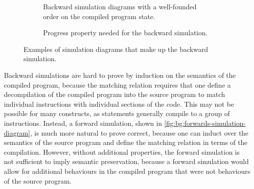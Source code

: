 \begin{figure}
  \centering
  \begin{subfigure}[t]{0.6\linewidth}
    \centering
  \caption{Backward simulation diagrams with a well-founded order on the
    compiled program state.}%
  \label{fig:bg:backwards-simulation-diagram}
  \end{subfigure}\hfill%
  \begin{subfigure}[t]{0.35\linewidth}
    \centering
    \caption{Progress property needed for the backward simulation.}%
    \label{fig:bg:backwards-progress-property}
  \end{subfigure}
  \caption{Examples of simulation diagrams that make up the backward
    simulation.}%
  \label{fig:bg:backwards-simulation}
\end{figure}

Backward simulations are hard to prove by induction on the semantics of the
compiled program, because the matching relation requires that one define a
decompilation of the compiled program into the source program to match
individual instructions with individual sections of the code.  This may not be
possible for many constructs, as statements generally compile to a group of
instructions.  Instead, a forward simulation, shown in
\cref{fig:bg:forwards-simulation-diagram}, is much more natural to prove
correct, because one can induct over the semantics of the source program and
define the matching relation in terms of the compilation.  However, without
additional properties, the forward simulation is not sufficient to imply
semantic preservation, because a forward simulation would allow for additional
behaviours in the compiled program that were not behaviours of the source
program.

